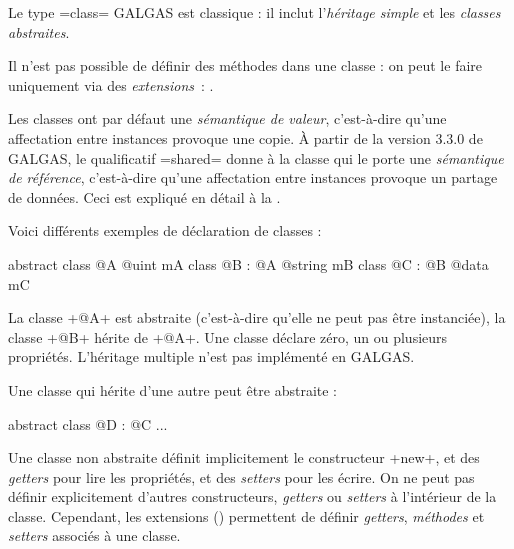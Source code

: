 

\tableDesMatieresDuChapitre


Le type \ggs=class= GALGAS est classique : il inclut l'\emph{héritage simple} et les \emph{classes abstraites}.

Il n'est pas possible de définir des méthodes dans une classe : on peut le faire uniquement via des \emph{extensions}~: .

Les classes ont par défaut une \emph{sémantique de valeur}, c'est-à-dire qu'une affectation entre instances provoque une copie. À partir de la version 3.3.0 de GALGAS, le qualificatif \ggs=shared= donne à la classe qui le porte une \emph{sémantique de référence}, c'est-à-dire qu'une affectation entre instances provoque un partage de données. Ceci est expliqué en détail à la .










Voici différents exemples de déclaration de classes :

\begin{galgas}
abstract class @A {
  @uint mA
}
class @B : @A {
  @string mB
}
class @C : @B {
  @data mC
}
\end{galgas}

La classe \ggs+@A+ est abstraite (c'est-à-dire qu'elle ne peut pas être instanciée), la classe \ggs+@B+ hérite de \ggs+@A+. Une classe déclare zéro, un ou plusieurs propriétés. L'héritage multiple n'est pas implémenté en GALGAS.

Une classe qui hérite d'une autre peut être abstraite :
\begin{galgas}
abstract class @D : @C {
  ...
 }
\end{galgas}

Une classe non abstraite définit implicitement le constructeur \ggs+new+, et des \emph{getters} pour lire les propriétés, et des \emph{setters} pour les écrire. On ne peut pas définir explicitement d'autres constructeurs, \emph{getters} ou \emph{setters} à l'intérieur de la classe. Cependant,  les extensions () permettent de définir \emph{getters}, \emph{méthodes} et \emph{setters} associés à une classe.











